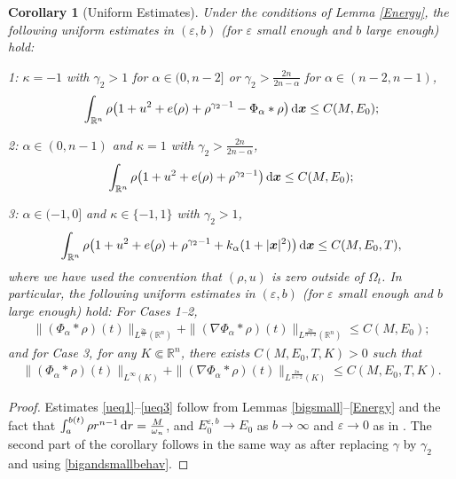 \documentclass[reqno,11pt]{amsart}
\numberwithin{equation}{section}
\newtheorem{corollary}[theorem]{Corollary}
\theoremstyle{definition}
\def\v{\varepsilon}
\def\dd{{\, \rm d}}
\begin{document}
\begin{corollary}[Uniform Estimates]\label{uniform}
Under the conditions of {\rm Lemma \ref{Energy}}, the following uniform estimates in $(\varepsilon,b)$
{\rm (}for $\varepsilon$ small enough and $b$ large enough{\rm )} hold{\rm :}

\smallskip
{} {\rm 1:} $\kappa = -1$ with $\gamma_2 > 1$ for $\alpha \in (0,n-2]$ 
or $\gamma_2 > \frac{2n}{2n - \alpha}$ for $\alpha \in (n-2,n-1)$,
\begin{align}\label{ueq1}
\int_{\mathbb{R}^n} \rho \big(1 + u^2 + e(\rho) + \rho^{\gamma_2 - 1} - \Phi_\alpha * \rho\big)
\dd \boldsymbol{x} \leq C(M,E_0);
\end{align}

 {\rm 2:} $\alpha \in (0,n-1)$ and $\kappa = 1$ with $\gamma_2 > \frac{2n}{2n - \alpha}$,
\begin{align*}
\int_{\mathbb{R}^n} \rho \big(1 + u^2 + e(\rho) + \rho^{\gamma_2 - 1} \big) \dd \boldsymbol{x}
   \leq C(M,E_0);
\end{align*}

 {\rm 3:} $\alpha \in (-1,0]$ and $\kappa \in\{-1,1\}$ with $\gamma_2 > 1$,
\begin{align}\label{ueq3}
\int_{\mathbb{R}^n} \rho \big(1 + u^2 + e(\rho) + \rho^{\gamma_2 - 1} + k_\alpha(1 + |\boldsymbol{x}|^2) \big)
\dd \boldsymbol{x} \leq C(M,E_0,T),
    \end{align}
where we have used the convention that $(\rho, u)$ is zero outside of $\Omega_t$.
In particular, the following uniform estimates in $(\varepsilon,b)$
{\rm (}for $\varepsilon$ small enough and $b$ large enough{\rm )} hold{\rm :} For {\rm Cases 1--2},
\begin{align*}
\|(\Phi_\alpha*\rho)(t)\|_{L^{\frac{2n}{\alpha}}(\mathbb{R}^n)}
+\|(\nabla \Phi_\alpha*\rho)(t)\|_{L^\frac{2n}{\alpha + 2}(\mathbb{R}^n)} \leq C(M,E_0);
    \end{align*}
and for {\rm Case 3}, for any $K \Subset \mathbb{R}^n$, there exists $C(M,E_0,T,K)>0$ such that
\begin{align*}
\|(\Phi_\alpha*\rho)(t)\|_{L^\infty(K)}
+\|(\nabla \Phi_\alpha*\rho)(t)\|_{L^\frac{2n}{\alpha + 2}(K)} \leq C(M,E_0,T,K).
\end{align*}
\end{corollary}

\begin{proof}
Estimates \eqref{ueq1}--\eqref{ueq3} follow from Lemmas \ref{bigsmall}--\ref{Energy} 
and the fact that $\int^{b(t)}_a \rho r^{n-1} \dd r =  \frac{M}{\omega_n}$,
and
$E_0^{\v,b} \to E_0$ as $b \to \infty$ and $\varepsilon \to 0$ as in \cite[Lemma B.8]{Carrillo2025}. The second part of the corollary follows in the same way as \cite[Corollary 3.6]{Carrillo2025} 
after replacing $\gamma$ by $\gamma_2$ and using \eqref{bigandsmallbehav}.
\end{proof}
\end{document}
